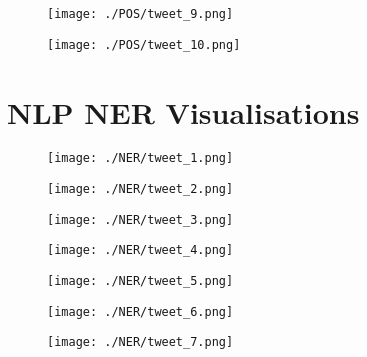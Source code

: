 \begin{figure}[h]
	\centering
	\texttt{[image: ./POS/tweet\_9.png]}
	\caption{}
	
\end{figure} 

\begin{figure}[h]
	\centering
	\texttt{[image: ./POS/tweet\_10.png]}
	\caption{}
	
\end{figure} 

\chapter{NLP NER Visualisations}
\label{app:NER_vis}

\begin{figure}[h]
	\centering
	\texttt{[image: ./NER/tweet\_1.png]}
	\caption{}
	
	
\end{figure} 
\begin{figure}[h]
	\centering
	\texttt{[image: ./NER/tweet\_2.png]}
	\caption{}
	
	
\end{figure} 

\begin{figure}[h]
	\centering
	\texttt{[image: ./NER/tweet\_3.png]}
	\caption{}
	
	
\end{figure} 

\begin{figure}[h]
	\centering
	\texttt{[image: ./NER/tweet\_4.png]}
	\caption{}
	
	
\end{figure} 
\begin{figure}[h]
	\centering
	\texttt{[image: ./NER/tweet\_5.png]}
	\caption{}
	
\end{figure} 

\begin{figure}[h]
	\centering
	\texttt{[image: ./NER/tweet\_6.png]}
	\caption{}
	
\end{figure} 


\begin{figure}[h]
	\centering
	\texttt{[image: ./NER/tweet\_7.png]}
	\caption{}
	
\end{figure} 


